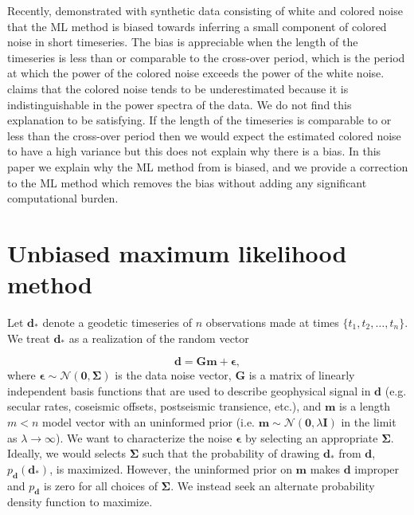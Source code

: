 \documentclass[10pt,a4paper]{article}
\begin{document}
Recently, \citet{Langbein2012} demonstrated with synthetic data consisting of white and colored noise that the ML method is biased towards inferring a small component of colored noise in short timeseries.  The bias is appreciable when the length of the timeseries is less than or comparable to the cross-over period, which is the period at which the power of the colored noise exceeds the power of the white noise. \citet{Langbein2012} claims that the colored noise tends to be underestimated because it is indistinguishable in the power spectra of the data. We do not find this explanation to be satisfying. If the length of the timeseries is comparable to or less than the cross-over period then we would expect the estimated colored noise to have a high variance but this does not explain why there is a bias. In this paper we explain why the ML method from \citet{Langbein1997} is biased, and we provide a correction to the ML method which removes the bias without adding any significant computational burden. 

\section{Unbiased maximum likelihood method}

Let $\mathbf{d_*}$ denote a geodetic timeseries of $n$ observations made at times $\{t_1,t_2,\dots,t_n\}$. We treat $\mathbf{d_*}$ as a realization of the random vector

\begin{equation}\label{LangbeinModel}
  \mathbf{d} = \mathbf{Gm} + \mathbf{\epsilon},
\end{equation}
where $\mathbf{\epsilon} \sim \mathcal{N}(\mathbf{0},\mathbf{\Sigma})$ is the data noise vector, $\mathbf{G}$ is a matrix of linearly independent basis functions that are used to describe geophysical signal in $\mathbf{d}$ (e.g. secular rates, coseismic offsets, postseismic transience, etc.), and $\mathbf{m}$ is a length $m < n$ model vector with an uninformed prior (i.e. $\mathbf{m} \sim \mathcal{N}(\mathbf{0},\lambda\mathbf{I})$ in the limit as $\lambda \to \infty$). We want to characterize the noise $\mathbf{\epsilon}$ by selecting an appropriate $\mathbf{\Sigma}$. Ideally, we would selects $\mathbf{\Sigma}$ such that the probability of drawing $\mathbf{d_*}$ from $\mathbf{d}$, $p_\mathbf{d}(\mathbf{d_*})$, is maximized.  However, the uninformed prior on $\mathbf{m}$ makes $\mathbf{d}$ improper and $p_\mathbf{d}$ is zero for all choices of $\mathbf{\Sigma}$. We instead seek an alternate probability density function to maximize. 
\end{document}
